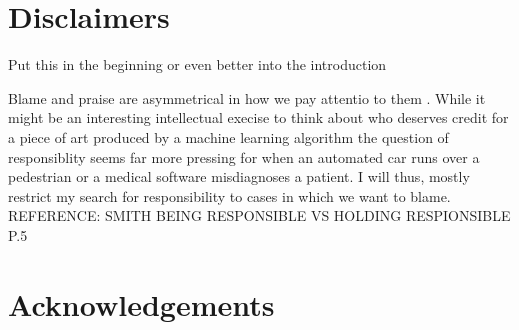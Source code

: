 \documentclass{article}
\begin{document}
\section{Disclaimers}
Put this in the beginning or even better into the introduction

Blame and praise are asymmetrical in how we pay attentio to them . While it
might be an interesting intellectual execise to think about who deserves credit
for a piece of art produced by a machine learning algorithm the question of
responsiblity seems far more pressing for when an automated car runs over a
pedestrian or a medical software misdiagnoses a patient. I will thus, mostly
restrict my search for responsibility to cases in which we want to blame.
REFERENCE: SMITH BEING RESPONSIBLE VS HOLDING RESPIONSIBLE P.5
\section{Acknowledgements}
\clearpage

\printglossary[type=\acronymtype]
\printglossary
\printbibliography
\end{document}

